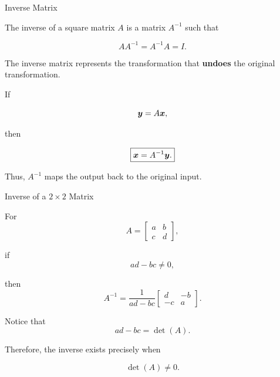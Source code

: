 
\begin{frame}{Inverse Matrix}

The inverse of a square matrix $A$ is a matrix $A^{-1}$
such that

\[
\boxed{
AA^{-1}=A^{-1}A=I.
}
\]

\vspace{0.4cm}

The inverse matrix represents the transformation that
\textbf{undoes} the original transformation.

If

\[
\bm{y}=A\bm{x},
\]

then

\[
\boxed{
\bm{x}=A^{-1}\bm{y}.
}
\]

\vspace{0.3cm}

Thus, $A^{-1}$ maps the output back to the original input.

\end{frame}



\begin{frame}{Inverse of a $2\times2$ Matrix}

For
\vspace{-0.1cm}
\[
A=
\begin{bmatrix}
a&b\\
c&d
\end{bmatrix},
\]

if
\vspace{-0.1cm}
\[
ad-bc\neq0,
\]

then
\vspace{-0.1cm}
\[
\boxed{
A^{-1}
=
\frac{1}{ad-bc}
\begin{bmatrix}
d&-b\\
-c&a
\end{bmatrix}.
}
\]

Notice that
\vspace{-0.1cm}
\[
ad-bc=\det(A).
\]

Therefore, the inverse exists precisely when

\[
\det(A)\neq0.
\]

\end{frame}


